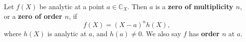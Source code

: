Let $f(X)$ be analytic at a point $a \in \mathbb{C}_X$. Then $a$ is a \textbf{zero of multiplicity $n$}, or a \textbf{zero of order $n$}, if
$$f(X) = (X - a)^n h(X),$$
where $h(X)$ is analytic at $a$, and $h(a) \neq 0$. We also say $f$ has \textbf{order $n$} at $a$.